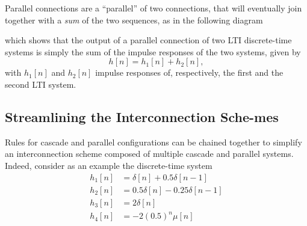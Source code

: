 \documentclass[\documentfontsize, twocolumn]{\classname}
\begin{document}
Parallel connections are a ``parallel'' of two connections, that will eventually join together with a \emph{sum} of the two sequences, as in the following diagram
\begin{center}
\end{center}
which shows that the output of a parallel connection of two LTI discrete-time systems is simply the sum of the impulse responses of the two systems, given by
\begin{equation}\label{eqn:parallelConnectionFormula}
    h[n] = h_1[n] + h_2[n],
\end{equation}
with $h_1[n]$ and $h_2[n]$ impulse responses of, respectively, the first and the second LTI system.

\subsection{Streamlining the Interconnection Sche-mes}

Rules for cascade and parallel configurations can be chained together to simplify an interconnection scheme composed of multiple cascade and parallel systems. Indeed, consider as an example the discrete-time system 
\begin{align*}
    h_1[n] &= \delta[n] + 0.5\delta[n-1]\\
    h_2[n] &= 0.5\delta[n] - 0.25\delta[n-1]\\
    h_3[n] &= 2\delta[n]\\
    h_4[n] &= -2(0.5)^n\mu[n]
\end{align*}
\end{document}

